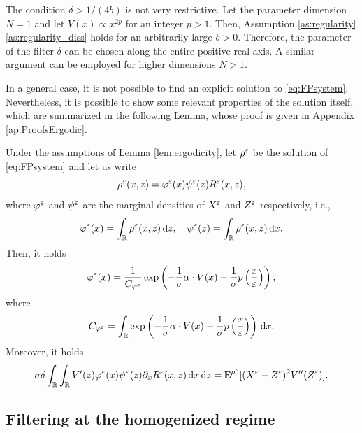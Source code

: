 \documentclass[10pt]{article}
\begin{document}
\begin{remark} The condition $\delta > 1 / (4b)$ is not very restrictive. Let the parameter dimension $N = 1$ and let $V(x) \propto x^{2p}$ for an integer $p > 1$. Then, Assumption \ref{as:regularity}\ref{as:regularity_diss} holds for an arbitrarily large $b > 0$. Therefore, the parameter of the filter $\delta$ can be chosen along the entire positive real axis. A similar argument can be employed for higher dimensions $N > 1$.
\end{remark}

In a general case, it is not possible to find an explicit solution to \eqref{eq:FPsystem}. Nevertheless, it is possible to show some relevant properties of the solution itself, which are summarized in the following Lemma, whose proof is given in Appendix \ref{ap:ProofsErgodic}.

\begin{lemma}\label{lem:FPMarginal} Under the assumptions of Lemma \ref{lem:ergodicity}, let $\rho^\varepsilon$ be the solution of \eqref{eq:FPsystem} and let us write 
\begin{equation}\label{eq:densityDecomposition}
	\rho^\varepsilon(x, z) = \varphi^\varepsilon(x)\psi^\varepsilon(z)R^\varepsilon(x,z),
\end{equation}
where $\varphi^\varepsilon$ and $\psi^\varepsilon$ are the marginal densities of $X^\varepsilon$ and $Z^\varepsilon$ respectively, i.e., 
\begin{equation}
	\varphi^\varepsilon(x) = \int_{\mathbb{R}} \rho^\varepsilon(x,z) \,\mathrm{d} z, \quad  \psi^\varepsilon(z) = \int_{\mathbb{R}} \rho^\varepsilon(x,z) \,\mathrm{d} x.
\end{equation}
Then, it holds
\begin{equation}\label{eq:marginalX}
	\varphi^\varepsilon(x) = \frac{1}{C_{\varphi^\varepsilon}} \exp\left(-\frac{1}{\sigma} \alpha \cdot V(x) - \frac{1}{\sigma} p \left ( \frac{x}{\varepsilon} \right )\right),
\end{equation}
where
\begin{equation}
	C_{\varphi^\varepsilon} = \int_{\mathbb{R}} \exp\left(-\frac{1}{\sigma} \alpha \cdot V(x) - \frac{1}{\sigma} p \left ( \frac{x}{\varepsilon} \right )\right) \,\mathrm{d} x.
\end{equation}
Moreover, it holds
\begin{equation}
	\sigma \delta \int_{\mathbb{R}} \int_{\mathbb{R}} V'(z) \varphi^\varepsilon(x) \psi^\varepsilon(z) \partial_x R^\varepsilon(x,z) \,\mathrm{d} x \,\mathrm{d} z = \operatorname{\mathbb{E}}^{\rho^\varepsilon}[(X^\varepsilon - Z^\varepsilon)^2 V''(Z^\varepsilon)].
\end{equation}
\end{lemma}

\subsection{Filtering at the homogenized regime}\label{sec:Slow}
\end{document}
